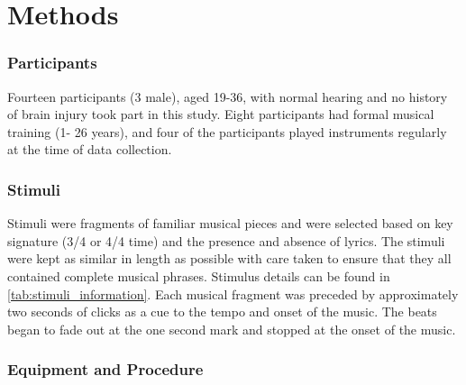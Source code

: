 \chapter*{Methods}
\subsection*{Participants}
Fourteen participants (3 male), aged 19-36, with normal hearing and no history of brain injury took part in this study. Eight participants had formal musical training (1- 26 years), and four of the participants played instruments regularly at the time of data collection.
\vspace{-0.5em}
\subsection*{Stimuli}
Stimuli were fragments of familiar musical pieces and were selected based on key signature (3/4 or 4/4 time) and the presence and absence of lyrics. The stimuli were kept as similar in length as possible with care taken to ensure that they all contained complete musical phrases. Stimulus details can be found in \autoref{tab:stimuli_information}.
Each musical fragment was preceded by approximately two seconds of clicks as a cue to the tempo and onset of the music. The beats began to fade out at the one second mark and stopped at the onset of the music. 

\subsection*{Equipment and Procedure}
